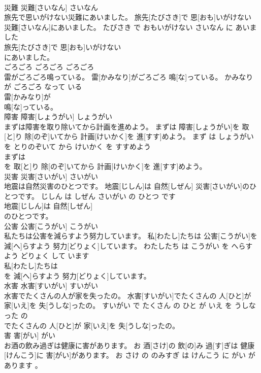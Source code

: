 \documentclass[8pt]{extreport}
\begin{document}
\begin{CJK}{UTF8}{min}
\\	災難	災難[さいなん]	さいなん	
\\	旅先で思いがけない災難にあいました。	旅先[たびさき]で 思[おも]いがけない 災難[さいなん]にあいました。	たびさき で おもいがけない さいなん に あいました	
\\	旅先[たびさき]で 思[おも]いがけない
\\	にあいました。			
\\	ごろごろ	ごろごろ	ごろごろ	
\\	雷がごろごろ鳴っている。	雷[かみなり]がごろごろ 鳴[な]っている。	かみなり が ごろごろ なって いる	
\\	雷[かみなり]が
\\	鳴[な]っている。			
\\	障害	障害[しょうがい]	しょうがい	
\\	まずは障害を取り除いてから計画を進めよう。	まずは 障害[しょうがい]を 取[と]り 除[のぞ]いてから 計画[けいかく]を 進[すす]めよう。	まず は しょうがい を とりのぞいて から けいかく を すすめよう	
\\	まずは
\\	を 取[と]り 除[のぞ]いてから 計画[けいかく]を 進[すす]めよう。			
\\	災害	災害[さいがい]	さいがい	
\\	地震は自然災害のひとつです。	地震[じしん]は 自然[しぜん] 災害[さいがい]のひとつです。	じしん は しぜん さいがい の ひとつ です	
\\	地震[じしん]は 自然[しぜん]
\\	のひとつです。			
\\	公害	公害[こうがい]	こうがい	
\\	私たちは公害を減らすよう努力しています。	私[わたし]たちは 公害[こうがい]を 減[へ]らすよう 努力[どりょく]しています。	わたしたち は こうがい を へらす よう どりょく して います	
\\	私[わたし]たちは
\\	を 減[へ]らすよう 努力[どりょく]しています。			
\\	水害	水害[すいがい]	すいがい	
\\	水害でたくさんの人が家を失ったの。	水害[すいがい]でたくさんの 人[ひと]が 家[いえ]を 失[うしな]ったの。	すいがい で たくさん の ひと が いえ を うしなった の	
\\	でたくさんの 人[ひと]が 家[いえ]を 失[うしな]ったの。			
\\	害	害[がい]	がい	
\\	お酒の飲み過ぎは健康に害があります。	お 酒[さけ]の 飲[の]み 過[す]ぎは 健康[けんこう]に 害[がい]があります。	お さけ の のみすぎ は けんこう に がい が あります 。	

\end{CJK}
\end{document}
